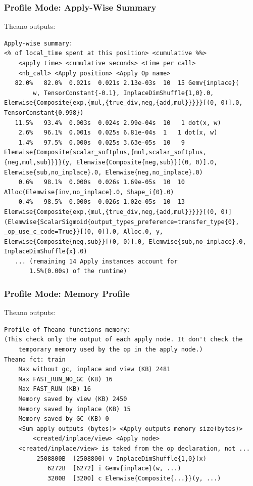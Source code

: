 \documentclass[a4paper,9pt]{beamer}
\begin{document}
\begin{frame}[fragile]
\frametitle{Profile Mode: Apply-Wise Summary}
Theano outputs:
\vfill
\begin{Verbatim}
Apply-wise summary:
<% of local_time spent at this position> <cumulative %%>
    <apply time> <cumulative seconds> <time per call>
    <nb_call> <Apply position> <Apply Op name>
   82.0%   82.0%  0.021s  0.021s 2.13e-03s  10  15 Gemv{inplace}(
        w, TensorConstant{-0.1}, InplaceDimShuffle{1,0}.0, Elemwise{Composite{exp,{mul,{true_div,neg,{add,mul}}}}}[(0, 0)].0, TensorConstant{0.998})
   11.5%   93.4%  0.003s  0.024s 2.99e-04s  10   1 dot(x, w)
    2.6%   96.1%  0.001s  0.025s 6.81e-04s  1   1 dot(x, w)
    1.4%   97.5%  0.000s  0.025s 3.63e-05s  10   9 Elemwise{Composite{scalar_softplus,{mul,scalar_softplus,{neg,mul,sub}}}}(y, Elemwise{Composite{neg,sub}}[(0, 0)].0, Elemwise{sub,no_inplace}.0, Elemwise{neg,no_inplace}.0)
    0.6%   98.1%  0.000s  0.026s 1.69e-05s  10  10 Alloc(Elemwise{inv,no_inplace}.0, Shape_i{0}.0)
    0.4%   98.5%  0.000s  0.026s 1.02e-05s  10  13 Elemwise{Composite{exp,{mul,{true_div,neg,{add,mul}}}}}[(0, 0)](Elemwise{ScalarSigmoid{output_types_preference=transfer_type{0}, _op_use_c_code=True}}[(0, 0)].0, Alloc.0, y, Elemwise{Composite{neg,sub}}[(0, 0)].0, Elemwise{sub,no_inplace}.0, InplaceDimShuffle{x}.0)
   ... (remaining 14 Apply instances account for 
       1.5%(0.00s) of the runtime)
\end{Verbatim}
\end{frame}

\begin{frame}[fragile]
\frametitle{Profile Mode: Memory Profile}
Theano outputs:
\vfill
\begin{Verbatim}
Profile of Theano functions memory:
(This check only the output of each apply node. It don't check the 
    temporary memory used by the op in the apply node.)
Theano fct: train
    Max without gc, inplace and view (KB) 2481
    Max FAST_RUN_NO_GC (KB) 16
    Max FAST_RUN (KB) 16
    Memory saved by view (KB) 2450
    Memory saved by inplace (KB) 15
    Memory saved by GC (KB) 0
    <Sum apply outputs (bytes)> <Apply outputs memory size(bytes)> 
        <created/inplace/view> <Apply node>
    <created/inplace/view> is taked from the op declaration, not ...
         2508800B  [2508800] v InplaceDimShuffle{1,0}(x)
            6272B  [6272] i Gemv{inplace}(w, ...)
            3200B  [3200] c Elemwise{Composite{...}}(y, ...)
\end{Verbatim}
\end{frame}
\end{document}
